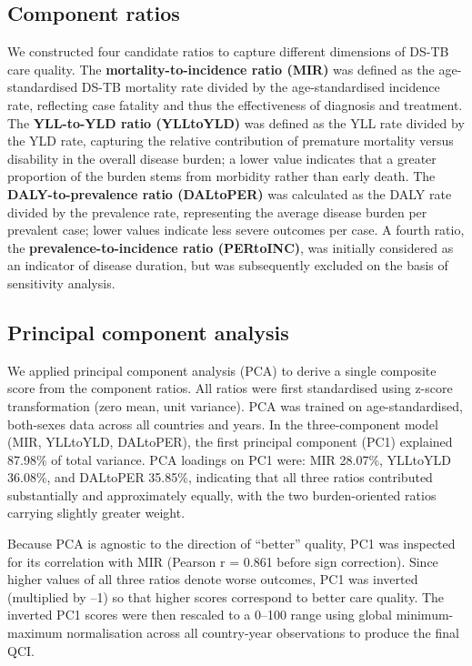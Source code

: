 \documentclass[12pt]{article}
\begin{document}
\subsection{Component ratios}

We constructed four candidate ratios to capture different dimensions of DS-TB care quality. The \textbf{mortality-to-incidence ratio (MIR)} was defined as the age-standardised DS-TB mortality rate divided by the age-standardised incidence rate, reflecting case fatality and thus the effectiveness of diagnosis and treatment. The \textbf{YLL-to-YLD ratio (YLLtoYLD)} was defined as the YLL rate divided by the YLD rate, capturing the relative contribution of premature mortality versus disability in the overall disease burden; a lower value indicates that a greater proportion of the burden stems from morbidity rather than early death. The \textbf{DALY-to-prevalence ratio (DALtoPER)} was calculated as the DALY rate divided by the prevalence rate, representing the average disease burden per prevalent case; lower values indicate less severe outcomes per case. A fourth ratio, the \textbf{prevalence-to-incidence ratio (PERtoINC)}, was initially considered as an indicator of disease duration, but was subsequently excluded on the basis of sensitivity analysis.

\subsection{Principal component analysis}

We applied principal component analysis (PCA) to derive a single composite score from the component ratios. All ratios were first standardised using z-score transformation (zero mean, unit variance). PCA was trained on age-standardised, both-sexes data across all countries and years. In the three-component model (MIR, YLLtoYLD, DALtoPER), the first principal component (PC1) explained 87.98\% of total variance. PCA loadings on PC1 were: MIR 28.07\%, YLLtoYLD 36.08\%, and DALtoPER 35.85\%, indicating that all three ratios contributed substantially and approximately equally, with the two burden-oriented ratios carrying slightly greater weight.

Because PCA is agnostic to the direction of ``better'' quality, PC1 was inspected for its correlation with MIR (Pearson r = 0.861 before sign correction). Since higher values of all three ratios denote worse outcomes, PC1 was inverted (multiplied by --1) so that higher scores correspond to better care quality. The inverted PC1 scores were then rescaled to a 0--100 range using global minimum-maximum normalisation across all country-year observations to produce the final QCI.
\end{document}
